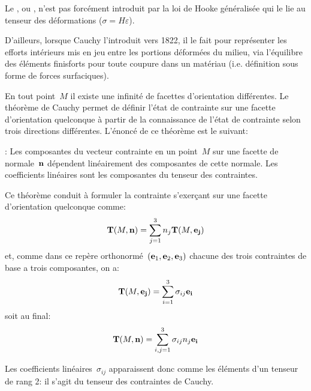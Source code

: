 \begin{histoire}%
Le , ou ,
n'est pas forcément introduit par la loi de Hooke généralisée qui le lie au tenseur des
déformations ($\sigma=H\varepsilon$).

\medskip
D'ailleurs, lorsque Cauchy l'introduit
vers 1822, il le fait pour représenter les efforts intérieurs
mis en jeu entre les portions déformées du milieu, via l'équilibre des éléments finisforts pour toute coupure
dans un matériau (i.e. définition sous forme de forces surfaciques).

\medskip
{}%
En tout point~$M$ il existe une infinité de facettes d'orientation différentes.
 Le théorème de Cauchy
 permet de définir l'état de contrainte sur une facette d'orientation quelconque
à partir de la connaissance de l'état de contrainte selon trois directions différentes.
L'énoncé de ce théorème est le suivant:

\begin{theoreme} :
Les composantes du vecteur contrainte en un point~$M$ sur une facette de normale~$\mathbf{n}$ dépendent
linéairement des composantes de cette normale. Les coefficients linéaires sont les composantes du
tenseur des contraintes.
\end{theoreme}

\medskip{}
Ce théorème conduit à formuler la contrainte s'exerçant sur une facette d'orientation quelconque comme:
\begin{equation}
\mathbf{T}(M,\mathbf{n}) = \displaystyle\sum_{j=1}^3 n_j \mathbf{T}(M,\mathbf{e_j})
\end{equation}
et, comme dans ce repère orthonormé~$(\mathbf{e}_1,\mathbf{e}_2,\mathbf{e}_3)$ chacune des trois contraintes
de base a trois composantes, on a:
\begin{equation}
\mathbf{T}(M,\mathbf{e_j}) = \displaystyle\sum_{i=1}^3 \sigma_{ij}\mathbf{e_i}
\end{equation}
soit au final:
\begin{equation}
\mathbf{T}(M,\mathbf{n}) = \displaystyle\sum_{i,j=1}^3 \sigma_{ij}n_j\mathbf{e_i}
\end{equation}

Les coefficients linéaires~$\sigma_{ij}$ apparaissent donc comme les éléments d'un tenseur de rang 2:
il s'agit du tenseur des contraintes de Cauchy.
\end{histoire}
